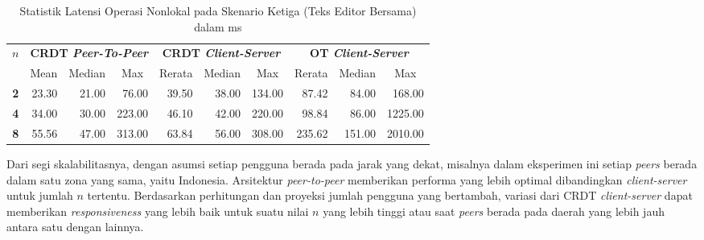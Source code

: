 \begin{table}[H]
 \centering

 \caption{Statistik Latensi Operasi Nonlokal pada Skenario Ketiga (Teks Editor Bersama) dalam ms}
 \label{tab:latency-3}
 \begin{tabular}{|c|rrr|rrr|rrr|}
\hline
\multirow{2}{*}{$n$} & \multicolumn{3}{c|}{\textbf{CRDT \textit{Peer-To-Peer}}} & \multicolumn{3}{c|}{\textbf{CRDT \textit{Client-Server}}} & \multicolumn{3}{c|}{\textbf{OT \textit{Client-Server}}} \\ \cline{2-10}
 & \multicolumn{1}{c|}{Mean} & \multicolumn{1}{c|}{Median} & \multicolumn{1}{c|}{Max} & \multicolumn{1}{c|}{Rerata} & \multicolumn{1}{c|}{Median} & \multicolumn{1}{c|}{Max} & \multicolumn{1}{c|}{Rerata} & \multicolumn{1}{c|}{Median} & \multicolumn{1}{c|}{Max} \\ \hline
\textbf{2} & \multicolumn{1}{r|}{23.30} & \multicolumn{1}{r|}{21.00} & 76.00 & \multicolumn{1}{r|}{39.50} & \multicolumn{1}{r|}{38.00} & 134.00 & \multicolumn{1}{r|}{87.42} & \multicolumn{1}{r|}{84.00} & 168.00 \\ \hline
\textbf{4} & \multicolumn{1}{r|}{34.00} & \multicolumn{1}{r|}{30.00} & 223.00 & \multicolumn{1}{r|}{46.10} & \multicolumn{1}{r|}{42.00} & 220.00 & \multicolumn{1}{r|}{98.84} & \multicolumn{1}{r|}{86.00} & 1225.00 \\ \hline
\textbf{8} & \multicolumn{1}{r|}{55.56} & \multicolumn{1}{r|}{47.00} & 313.00 & \multicolumn{1}{r|}{63.84} & \multicolumn{1}{r|}{56.00} & 308.00 & \multicolumn{1}{r|}{235.62} & \multicolumn{1}{r|}{151.00} & 2010.00 \\ \hline
\end{tabular}
\end{table}

Dari segi skalabilitasnya, dengan asumsi setiap pengguna berada pada jarak yang dekat, misalnya dalam eksperimen ini setiap \textit{peers} berada dalam satu zona yang sama, yaitu Indonesia. Arsitektur \textit{peer-to-peer} memberikan performa yang lebih optimal dibandingkan \textit{client-server} untuk jumlah $n$ tertentu. Berdasarkan perhitungan dan proyeksi jumlah pengguna yang bertambah, variasi dari CRDT \textit{client-server} dapat memberikan \textit{responsiveness} yang lebih baik untuk suatu nilai $n$ yang lebih tinggi atau saat \textit{peers} berada pada daerah yang lebih jauh antara satu dengan lainnya.

